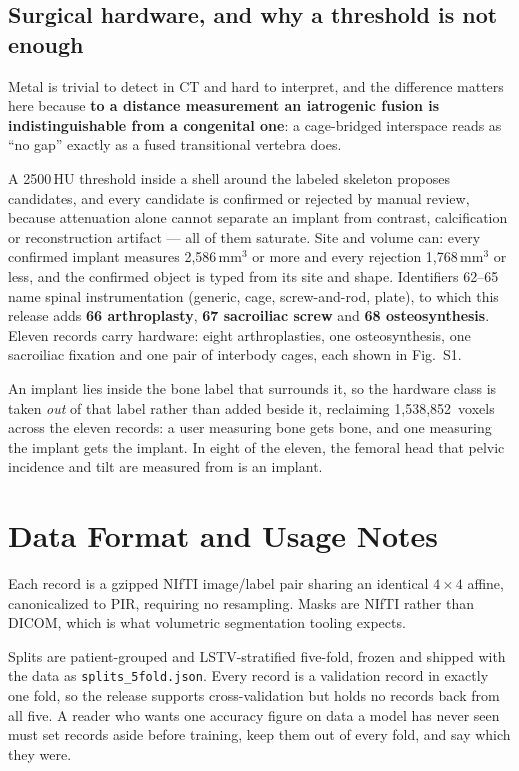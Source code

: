 \documentclass[aapm,mph,amsmath,amssymb,preprint,linenumbers]{revtex4-2}
\begin{document}
\subsection{Surgical hardware, and why a threshold is not enough}
\label{sec:hardware}

Metal is trivial to detect in CT and hard to interpret, and the difference matters here because
\textbf{to a distance measurement an iatrogenic fusion is indistinguishable from a congenital
one}: a cage-bridged interspace reads as ``no gap'' exactly as a fused transitional vertebra
does.

A 2500\,HU threshold inside a shell around the labeled skeleton proposes candidates, and every
candidate is confirmed or rejected by manual review, because attenuation alone cannot separate
an implant from contrast, calcification or reconstruction artifact --- all of them saturate.
Site and volume can: every confirmed implant measures 2,586\,mm$^3$ or more and every rejection
1,768\,mm$^3$ or less, and the confirmed object is typed from its site and shape. Identifiers
62--65 name spinal instrumentation (generic, cage, screw-and-rod, plate), to which this release
adds \textbf{66 arthroplasty}, \textbf{67 sacroiliac screw} and \textbf{68 osteosynthesis}.
Eleven records carry hardware: eight arthroplasties, one osteosynthesis, one sacroiliac
fixation and one pair of interbody cages, each shown in Fig.~S1.

An implant lies inside the bone label that surrounds it, so the hardware class is taken
\emph{out} of that label rather than added beside it, reclaiming 1,538,852\ voxels across
the eleven records: a user measuring bone gets bone, and one measuring the implant gets the
implant. In eight of the eleven, the femoral head that pelvic incidence and tilt are measured
from is an implant.

\section{Data Format and Usage Notes}\label{sec:format}

Each record is a gzipped NIfTI image/label pair sharing an identical $4\times4$ affine,
canonicalized to PIR, requiring no resampling. Masks are NIfTI rather than DICOM, which is what
volumetric segmentation tooling expects.

Splits are patient-grouped and LSTV-stratified five-fold, frozen and shipped with the data
as \texttt{splits\_5fold.json}. Every record is a validation record in exactly one fold, so
the release supports cross-validation but holds no records back from all five. A reader who
wants one accuracy figure on data a model has never seen must set records aside before
training, keep them out of every fold, and say which they were.
\end{document}
